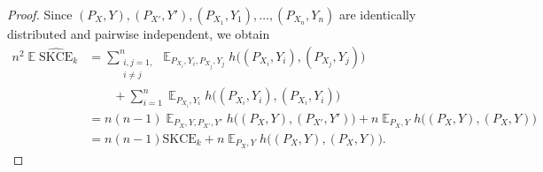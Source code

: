 \documentclass{article}
\DeclareMathOperator{\Exp}{\mathbb{E}}
\begin{document}
\begin{proof}
Since
$(P_X, Y), (P_{X'}, Y'), (P_{X_1}, Y_1), \ldots, (P_{X_n}, Y_n)$ are
identically distributed and pairwise independent, we obtain
\begin{equation}\label{eq:expected_skceb}
    \begin{split}
        n^2 \Exp \widehat{\mathrm{SKCE}}_k &= \sum_{\substack{i,j=1,\\i \neq j}}^n \Exp_{P_{X_i}, Y_i, P_{X_j}, Y_j} h\big((P_{X_i}, Y_i), (P_{X_j}, Y_j)\big) \\
        &\qquad +
        \sum_{i=1}^n \Exp_{P_{X_i}, Y_i} h\big((P_{X_i}, Y_i), (P_{X_i}, Y_i)\big) \\
        &= n(n-1) \Exp_{P_X,Y,P_{X'},Y'} h\big((P_X, Y), (P_{X'}, Y')\big) + n \Exp_{P_X, Y} h\big((P_X, Y), (P_X, Y)\big) \\
        &= n(n-1) \mathrm{SKCE}_k + n \Exp_{P_X, Y} h\big((P_X, Y), (P_X, Y)\big).
    \end{split}
\end{equation}


\end{proof}
\end{document}
